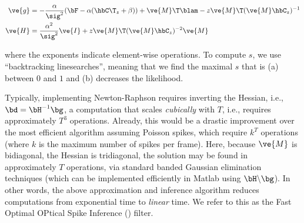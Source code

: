 \begin{subequations} \label{eq:NR}
\begin{align}
\ve{g} &= -\frac{\alpha}{\sig^2}(\bF -\alpha({\hbC\T}_{\zzz} + \beta)) + \ve{M}\T\blam - \zzz \ve{M}\T (\ve{M} \hbC_{\zzz})^{-1} \label{eq:g} \\
\ve{H} &= \frac{\alpha^2}{\sig^2} \ve{I} + \zzz \ve{M}\T (\ve{M} \hbC_{\zzz})^{-2} \ve{M} \label{eq:H}
\end{align}
\end{subequations}

\noindent where %
the exponents indicate element-wise operations. To compute $s$, we use ``backtracking linesearches'', meaning that we find the maximal $s$ that is (a) between $0$ and $1$ and (b) decreases the likelihood.

Typically, implementing Newton-Raphson requires inverting the Hessian, i.e., $\bd = \bH^{-1} \bg$, a computation that scales \emph{cubically} with $T$, i.e., requires approximately $T^3$ operations. Already, this would be a drastic improvement over the most efficient algorithm assuming Poisson spikes, which require $k^T$ operations (where $k$ is the maximum number of spikes per frame).  Here, because $\ve{M}$ is bidiagonal, the Hessian is tridiagonal, the solution may be found in approximately $T$ operations, via standard banded Gaussian elimination techniques (which can be implemented efficiently in Matlab using $\bH \backslash \bg$). In other words, the above approximation and inference algorithm reduces computations from exponential time to \emph{linear} time. We refer to this as the Fast Optimal OPtical Spike Inference (\foopsi) filter. 